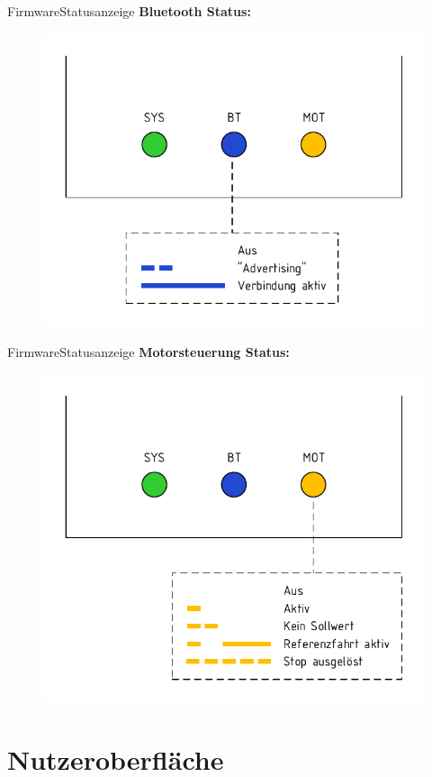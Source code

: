 \documentclass{beamer}
\begin{document}
\begin{frame}{Firmware}{Statusanzeige}
    \textbf{Bluetooth Status:}
    \begin{figure}[H]
        \includegraphics[width=.8\textwidth]{./img/Bluetoothstatus.pdf}
    \end{figure}
\end{frame}

\begin{frame}{Firmware}{Statusanzeige}
    \textbf{Motorsteuerung Status:}
    \begin{figure}[H]
        \includegraphics[width=.8\textwidth]{./img/Motorstatus.pdf}
    \end{figure}
\end{frame}

\section{Nutzeroberfläche}
\end{document}
